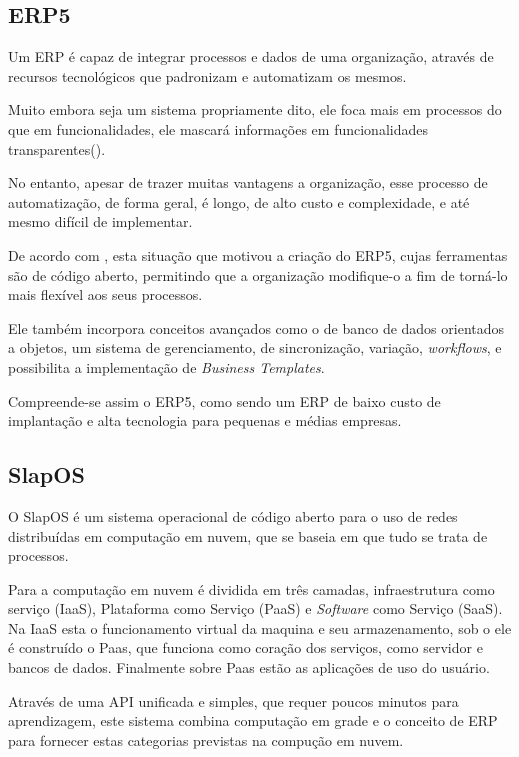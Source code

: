 \subsection{ERP5}

Um ERP é capaz de integrar processos e dados de uma organização, através de recursos tecnológicos que padronizam e automatizam os mesmos.

Muito embora seja um sistema propriamente dito, ele foca mais em processos do que em funcionalidades, ele mascará informações em funcionalidades transparentes(\cite{PITRE-DESAI}).

No entanto, apesar de trazer muitas vantagens a organização, esse processo de automatização, de forma geral, é longo, de alto custo e complexidade, e até mesmo difícil de implementar.

De acordo com \cite{SMETS-CARVALHO}, esta situação que motivou a criação do ERP5, cujas ferramentas são de código aberto, permitindo que a organização modifique-o a fim de torná-lo mais flexível aos seus processos.

Ele também incorpora conceitos avançados como o de banco de dados orientados a objetos, um sistema de gerenciamento, de sincronização, variação, \textit{workflows}, e possibilita a implementação de \textit{Business Templates}.

Compreende-se assim o ERP5, como sendo um ERP de baixo custo de implantação e alta tecnologia para pequenas e médias empresas.


\subsection{SlapOS}
\label{slapos}

O SlapOS é um sistema operacional de código aberto para o uso de redes distribuídas em computação em nuvem, que se baseia em que tudo se trata de processos.

Para \cite{SMETS-CERIN-COURTEAUD} a computação em nuvem é dividida em três camadas, infraestrutura como serviço (IaaS), Plataforma como Serviço (PaaS) e \textit{Software} como Serviço (SaaS). Na IaaS esta o funcionamento virtual da maquina e seu armazenamento, sob o ele é construído o Paas, que funciona como coração dos serviços, como servidor e bancos de dados. Finalmente sobre Paas estão as aplicações de uso do usuário.

Através de uma API unificada e simples, que requer poucos minutos para aprendizagem, este sistema combina computação em grade e o conceito de ERP para fornecer estas categorias previstas na compução em nuvem.

